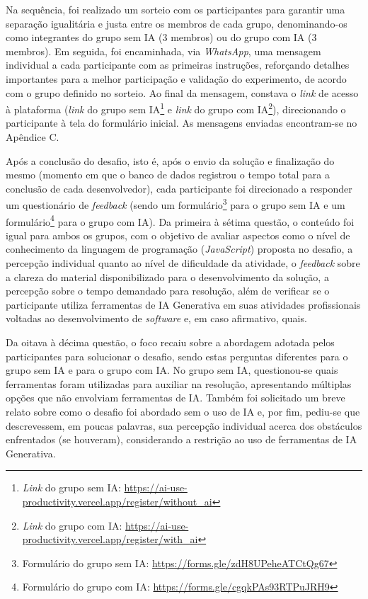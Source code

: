 \documentclass[english,brazilian]{UNISINOSartigo} %
\begin{document}
Na sequência, foi realizado um sorteio com os participantes para garantir uma separação igualitária e justa entre os membros de cada grupo, denominando-os como integrantes do grupo sem IA (3 membros) ou do grupo com IA (3 membros). Em seguida, foi encaminhada, via \textit{WhatsApp}, uma mensagem individual a cada participante com as primeiras instruções, reforçando detalhes importantes para a melhor participação e validação do experimento, de acordo com o grupo definido no sorteio. Ao final da mensagem, constava o \textit{link} de acesso à plataforma (\textit{link} do grupo sem IA\footnote{\textit{Link} do grupo sem IA: \url{https://ai-use-productivity.vercel.app/register/without_ai}} e \textit{link} do grupo com IA\footnote{\textit{Link} do grupo com IA: \url{https://ai-use-productivity.vercel.app/register/with_ai}}), direcionando o participante à tela do formulário inicial. As mensagens enviadas encontram-se no Apêndice C.

Após a conclusão do desafio, isto é, após o envio da solução e finalização do mesmo (momento em que o banco de dados registrou o tempo total para a conclusão de cada desenvolvedor), cada participante foi direcionado a responder um questionário de \textit{feedback} (sendo um formulário\footnote{Formulário do grupo sem IA: \url{https://forms.gle/zdH8UPeheATCtQg67}} para o grupo sem IA e um formulário\footnote{Formulário do grupo com IA: \url{https://forms.gle/cgqkPAs93RTPuJRH9}} para o grupo com IA). Da primeira à sétima questão, o conteúdo foi igual para ambos os grupos, com o objetivo de avaliar aspectos como o nível de conhecimento da linguagem de programação (\textit{JavaScript}) proposta no desafio, a percepção individual quanto ao nível de dificuldade da atividade, o \textit{feedback} sobre a clareza do material disponibilizado para o desenvolvimento da solução, a percepção sobre o tempo demandado para resolução, além de verificar se o participante utiliza ferramentas de IA Generativa em suas atividades profissionais voltadas ao desenvolvimento de \textit{software} e, em caso afirmativo, quais.

Da oitava à décima questão, o foco recaiu sobre a abordagem adotada pelos participantes para solucionar o desafio, sendo estas perguntas diferentes para o grupo sem IA e para o grupo com IA. No grupo sem IA, questionou-se quais ferramentas foram utilizadas para auxiliar na resolução, apresentando múltiplas opções que não envolviam ferramentas de IA. Também foi solicitado um breve relato sobre como o desafio foi abordado sem o uso de IA e, por fim, pediu-se que descrevessem, em poucas palavras, sua percepção individual acerca dos obstáculos enfrentados (se houveram), considerando a restrição ao uso de ferramentas de IA Generativa.
\end{document}
